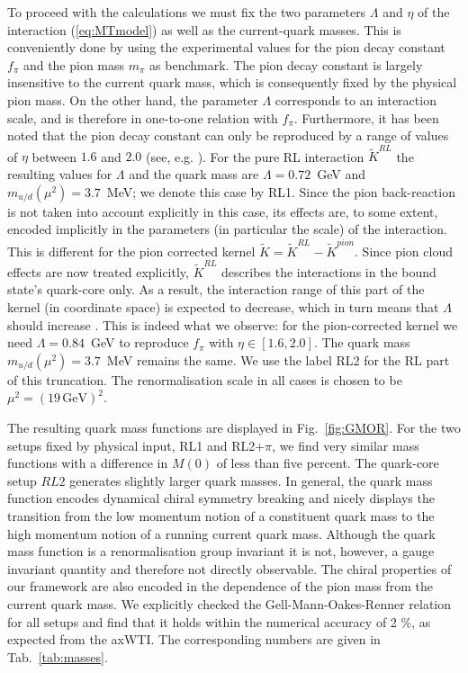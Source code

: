 To proceed with the calculations we must fix the two parameters $\Lambda$ 
and $\eta$ of the interaction (\ref{eq:MTmodel}) as well as the 
current-quark masses. This is conveniently done by using the 
experimental values for the pion decay constant $f_\pi$ and the pion mass $m_\pi$
as benchmark. The pion decay constant is largely insensitive to the 
current quark mass, which is consequently fixed by the physical pion mass.
On the other hand, the parameter $\Lambda$ corresponds to an interaction 
scale, and is therefore in one-to-one relation with $f_\pi$. Furthermore,
it has been noted that the pion decay constant can only be reproduced by 
a range of values of $\eta$ between $1.6$ and $2.0$ (see, e.g. 
\cite{Eichmann:2011vu,Krassnigg:2009zh}). 
For the pure RL interaction $\widetilde{K}^{RL}$ the resulting values for $\Lambda$ and the quark mass
are $\Lambda=0.72$~GeV and $m_{u/d}(\mu^2)=3.7$~MeV; we denote this case by RL1.
Since the pion back-reaction is not taken into account explicitly in this case,
its effects are, to some extent, encoded implicitly in the parameters (in particular the scale) 
of the interaction. This is different for the pion corrected kernel 
$\widetilde{K} = \widetilde{K}^{RL}-\widetilde{K}^{pion}$. Since pion cloud effects are 
now treated explicitly, $\widetilde{K}^{RL}$ describes 
the interactions in the bound state's quark-core only. As a result, the 
interaction range of this part of the kernel (in coordinate space) is expected to decrease, which in turn means that 
$\Lambda$ should increase \cite{Thomas:1981vc}. This is indeed what we observe: for the 
pion-corrected kernel we need $\Lambda=0.84$~GeV to reproduce $f_\pi$ with 
$\eta \in [1.6,2.0]$. The quark mass $m_{u/d}(\mu^2)=3.7$~MeV remains the same.
We use the label RL2 for the RL part of this truncation. 
The renormalisation scale in all cases is chosen to be $\mu^2= (19 \,\mbox{GeV})^2$.

The resulting quark mass functions are displayed in Fig.~\ref{fig:GMOR}. For the 
two setups fixed by physical input, RL1 and RL2+$\pi$,
we find very similar mass functions with a difference in $M(0)$ of less than 
five percent. The quark-core setup $RL2$ generates slightly larger quark masses.
In general, the quark mass function encodes dynamical chiral symmetry breaking and 
nicely displays the transition from the low momentum notion of a constituent quark 
mass to the high momentum notion of a running current quark mass. Although the 
quark mass function is a renormalisation group invariant it is not, however, a 
gauge invariant quantity and therefore not directly observable. The chiral properties 
of our framework are also encoded in the dependence of the pion mass from the 
current quark mass. We explicitly checked the Gell-Mann-Oakes-Renner relation
for all setups and find that it holds within the numerical accuracy of 2 \%, 
as expected from the axWTI. The corresponding numbers are given in 
Tab.~\ref{tab:masses}.


